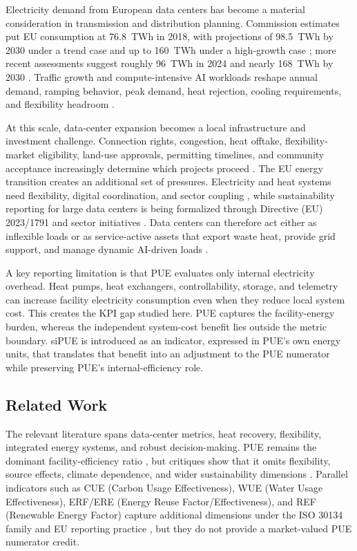 \documentclass[preprint,12pt]{elsarticle}
\begin{document}
Electricity demand from European data centers has become a material consideration in transmission and distribution planning. Commission estimates put EU consumption at 76.8~TWh in 2018, with projections of 98.5~TWh by 2030 under a trend case and up to 160~TWh under a high-growth case \cite{1}; more recent assessments suggest roughly 96~TWh in 2024 and nearly 168~TWh by 2030 \cite{2}. Traffic growth and compute-intensive AI workloads reshape annual demand, ramping behavior, peak demand, heat rejection, cooling requirements, and flexibility headroom \cite{14,19}.

At this scale, data-center expansion becomes a local infrastructure and investment challenge. Connection rights, congestion, heat offtake, flexibility-market eligibility, land-use approvals, permitting timelines, and community acceptance increasingly determine which projects proceed \cite{6,21}. The EU energy transition creates an additional set of pressures. Electricity and heat systems need flexibility, digital coordination, and sector coupling \cite{7,8}, while sustainability reporting for large data centers is being formalized through Directive (EU) 2023/1791 and sector initiatives \cite{15,16}. Data centers can therefore act either as inflexible loads or as service-active assets that export waste heat, provide grid support, and manage dynamic AI-driven loads \cite{11,13}.

A key reporting limitation is that PUE evaluates only internal electricity overhead. Heat pumps, heat exchangers, controllability, storage, and telemetry can increase facility electricity consumption even when they reduce local system cost. This creates the KPI gap studied here. PUE captures the facility-energy burden, whereas the independent system-cost benefit lies outside the metric boundary. siPUE is introduced as an indicator, expressed in PUE's own energy units, that translates that benefit into an adjustment to the PUE numerator while preserving PUE's internal-efficiency role.

\subsection{Related Work}
\label{sec:related}

The relevant literature spans data-center metrics, heat recovery, flexibility, integrated energy systems, and robust decision-making. PUE remains the dominant facility-efficiency ratio \cite{Belady2008PUE,greengrid2014}, but critiques show that it omits flexibility, source effects, climate dependence, and wider sustainability dimensions \cite{Reddy2017,VandeVoort2017}. Parallel indicators such as CUE (Carbon Usage Effectiveness), WUE (Water Usage Effectiveness), ERF/ERE (Energy Reuse Factor/Effectiveness), and REF (Renewable Energy Factor) capture additional dimensions under the ISO 30134 family and EU reporting practice \cite{ISO30134,EUDataCenterDirective2023}, but they do not provide a market-valued PUE numerator credit.
\end{document}
